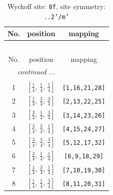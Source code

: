 \documentclass[fleqn,8pt]{jsarticle}
\begin{document}
\begin{longtable}{ccc}
\caption{Wyckoff site: {\tt 8f}, site symmetry: {\tt ..2'/m'}}
 \\
 \hline \hline
No. & position & mapping \\ \hline \endfirsthead

\multicolumn{2}{l}{\tablename\ \thetable{}} \\
 \hline \hline
No. & position & mapping \\ \hline \endhead

 \hline \hline
\multicolumn{2}{r}{\footnotesize\it continued ...} \\ \endfoot

 \hline \hline
\multicolumn{2}{r}{} \\ \endlastfoot

1 & $\left[ \frac{1}{4},\, \frac{1}{4},\, \frac{1}{4} \right]$ & {\tt [1,16,21,28]} \\ \hline
2 & $\left[ \frac{1}{4},\, \frac{3}{4},\, \frac{3}{4} \right]$ & {\tt [2,13,22,25]} \\ \hline
3 & $\left[ \frac{3}{4},\, \frac{1}{4},\, \frac{3}{4} \right]$ & {\tt [3,14,23,26]} \\ \hline
4 & $\left[ \frac{3}{4},\, \frac{3}{4},\, \frac{1}{4} \right]$ & {\tt [4,15,24,27]} \\ \hline
5 & $\left[ \frac{3}{4},\, \frac{3}{4},\, \frac{3}{4} \right]$ & {\tt [5,12,17,32]} \\ \hline
6 & $\left[ \frac{3}{4},\, \frac{1}{4},\, \frac{1}{4} \right]$ & {\tt [6,9,18,29]} \\ \hline
7 & $\left[ \frac{1}{4},\, \frac{3}{4},\, \frac{1}{4} \right]$ & {\tt [7,10,19,30]} \\ \hline
8 & $\left[ \frac{1}{4},\, \frac{1}{4},\, \frac{3}{4} \right]$ & {\tt [8,11,20,31]} \\
\end{longtable}
\renewcommand{\arraystretch}{1.2}
\end{document}
